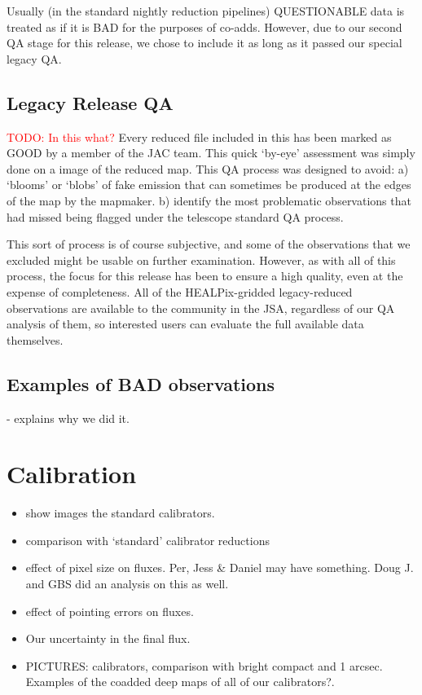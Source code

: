 \documentclass[twocolumn]{aastex6}
\newcommand{\todo}[1]{\textcolor{red}{TODO: #1}}
\newcommand{\status}[1]{\textsf{#1}}
\begin{document}
Usually (in the standard nightly reduction pipelines)
\status{QUESTIONABLE} data is treated as if it is \status{BAD} for the
purposes of co-adds. However, due to our second QA stage for this
release, we chose to include it as long as it passed our special
legacy QA.

\subsection{Legacy Release QA}

\todo{In this what?}
Every reduced file included in this has been marked as \status{GOOD}
by a member of the JAC team. This quick `by-eye' assessment was simply
done on a image of the reduced map. This QA process was designed to
avoid: a) `blooms' or `blobs' of fake emission that can sometimes be
produced at the edges of the map by the mapmaker.  b) identify the
most problematic observations that had missed being flagged under the
telescope standard QA process.

This sort of process is of course subjective, and some of the
observations that we excluded might be usable on further
examination. However, as with all of this process, the focus for this
release has been to ensure a high quality, even at the expense
of completeness. All of the HEALPix-gridded legacy-reduced
observations are available to the community in the JSA, regardless of
our QA analysis of them, so interested users can evaluate the full
available data themselves.

%
\subsection{Examples of BAD observations}
- explains why we did it.


\section{Calibration}



\begin{itemize}
\item show images the standard calibrators.
\item comparison with `standard' calibrator reductions
\item effect of pixel size on fluxes. Per, Jess \& Daniel may have
  something. Doug J. and GBS did an analysis on this as well.
\item effect of pointing errors on fluxes.
\item Our uncertainty in the final flux.

\item PICTURES: calibrators, comparison with bright compact and 1
  arcsec. Examples of the coadded deep maps of all of our
  calibrators?.
\end{itemize}
\end{document}

